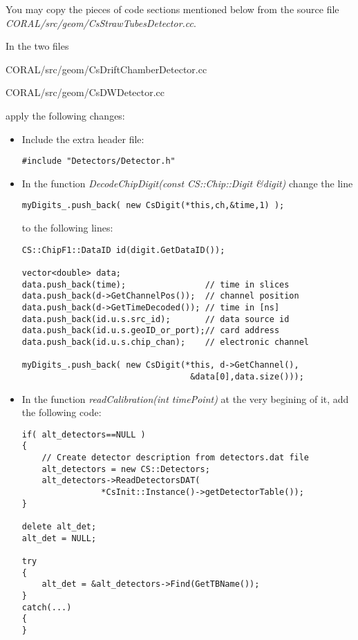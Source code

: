 \documentclass[a4paper,12pt]{article}
\begin{document}
You may copy the pieces of code sections mentioned below from
the source file \mbox{\it CORAL/src/geom/CsStrawTubesDetector.cc}.

In the two files
\begin{description}
\it
\item[] CORAL/src/geom/CsDriftChamberDetector.cc
\item[] CORAL/src/geom/CsDWDetector.cc
\end{description}
apply the following changes:
\begin{itemize}
\item Include the extra header file:
\begin{verbatim}
#include "Detectors/Detector.h"
\end{verbatim}
\item In the function {\it DecodeChipDigit(const CS::Chip::Digit \&digit)}
change the line
\begin{verbatim}
myDigits_.push_back( new CsDigit(*this,ch,&time,1) );
\end{verbatim}
to the following lines:
\begin{verbatim}
CS::ChipF1::DataID id(digit.GetDataID());

vector<double> data;
data.push_back(time);                // time in slices
data.push_back(d->GetChannelPos());  // channel position
data.push_back(d->GetTimeDecoded()); // time in [ns]
data.push_back(id.u.s.src_id);       // data source id
data.push_back(id.u.s.geoID_or_port);// card address
data.push_back(id.u.s.chip_chan);    // electronic channel

myDigits_.push_back( new CsDigit(*this, d->GetChannel(), 
                                  &data[0],data.size()));
\end{verbatim}

\item In the function {\it readCalibration(int timePoint)} at the very begining of it,
add the following code:
\begin{verbatim}
if( alt_detectors==NULL )
{
    // Create detector description from detectors.dat file
    alt_detectors = new CS::Detectors;
    alt_detectors->ReadDetectorsDAT(
                *CsInit::Instance()->getDetectorTable());
}

delete alt_det;
alt_det = NULL;

try
{
    alt_det = &alt_detectors->Find(GetTBName());
}
catch(...)
{
}
\end{verbatim}
\end{itemize}
\end{document}
